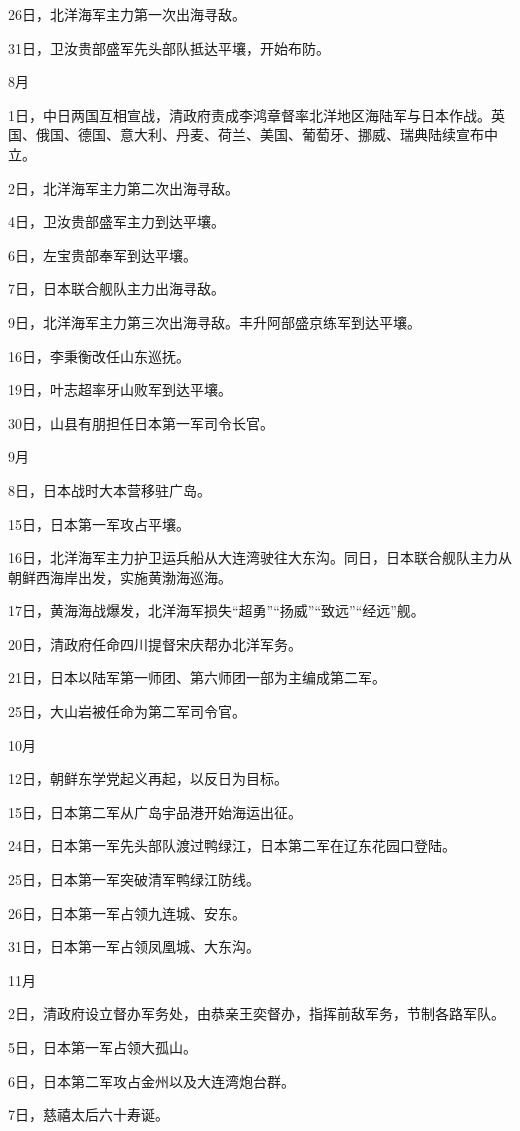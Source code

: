\documentclass[12pt,UTF8]{ctexbook}
\begin{document}
26日，北洋海军主力第一次出海寻敌。

31日，卫汝贵部盛军先头部队抵达平壤，开始布防。

8月

1日，中日两国互相宣战，清政府责成李鸿章督率北洋地区海陆军与日本作战。英国、俄国、德国、意大利、丹麦、荷兰、美国、葡萄牙、挪威、瑞典陆续宣布中立。

2日，北洋海军主力第二次出海寻敌。

4日，卫汝贵部盛军主力到达平壤。

6日，左宝贵部奉军到达平壤。

7日，日本联合舰队主力出海寻敌。

9日，北洋海军主力第三次出海寻敌。丰升阿部盛京练军到达平壤。

16日，李秉衡改任山东巡抚。

19日，叶志超率牙山败军到达平壤。

30日，山县有朋担任日本第一军司令长官。

9月

8日，日本战时大本营移驻广岛。

15日，日本第一军攻占平壤。

16日，北洋海军主力护卫运兵船从大连湾驶往大东沟。同日，日本联合舰队主力从朝鲜西海岸出发，实施黄渤海巡海。

17日，黄海海战爆发，北洋海军损失“超勇”“扬威”“致远”“经远”舰。

20日，清政府任命四川提督宋庆帮办北洋军务。

21日，日本以陆军第一师团、第六师团一部为主编成第二军。

25日，大山岩被任命为第二军司令官。

10月

12日，朝鲜东学党起义再起，以反日为目标。

15日，日本第二军从广岛宇品港开始海运出征。

24日，日本第一军先头部队渡过鸭绿江，日本第二军在辽东花园口登陆。

25日，日本第一军突破清军鸭绿江防线。

26日，日本第一军占领九连城、安东。

31日，日本第一军占领凤凰城、大东沟。

11月

2日，清政府设立督办军务处，由恭亲王奕督办，指挥前敌军务，节制各路军队。

5日，日本第一军占领大孤山。

6日，日本第二军攻占金州以及大连湾炮台群。

7日，慈禧太后六十寿诞。
\end{document}
